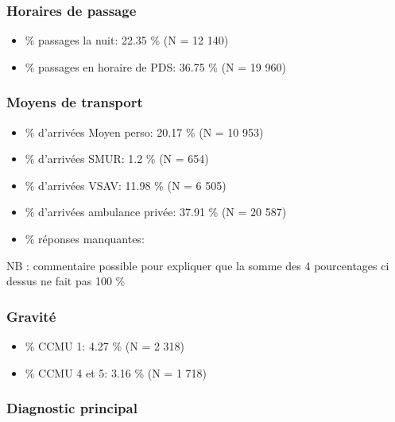 \documentclass[]{article}
\begin{document}
\subsubsection{Horaires de passage}\label{horaires-de-passage-1}

\begin{itemize}
\itemsep1pt\parskip0pt
\item
  \% passages la nuit: 22.35 \% (N = 12 140)
\item
  \% passages en horaire de PDS: 36.75 \% (N = 19 960)
\end{itemize}

\subsubsection{Moyens de transport}\label{moyens-de-transport}

\begin{itemize}
\itemsep1pt\parskip0pt
\item
  \% d'arrivées Moyen perso: 20.17 \% (N = 10 953)
\item
  \% d'arrivées SMUR: 1.2 \% (N = 654)
\item
  \% d'arrivées VSAV: 11.98 \% (N = 6 505)
\item
  \% d'arrivées ambulance privée: 37.91 \% (N = 20 587)
\item
  \% réponses manquantes:
\end{itemize}

NB : commentaire possible pour expliquer que la somme des 4 pourcentages
ci dessus ne fait pas 100 \%

\subsubsection{Gravité}\label{gravite}

\begin{itemize}
\itemsep1pt\parskip0pt
\item
  \% CCMU 1: 4.27 \% (N = 2 318)
\item
  \% CCMU 4 et 5: 3.16 \% (N = 1 718)
\end{itemize}

\subsubsection{Diagnostic principal}\label{diagnostic-principal}
\end{document}
